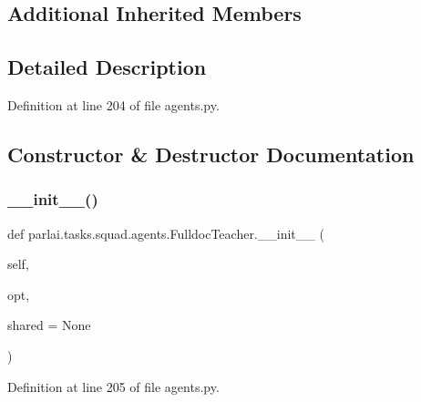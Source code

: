 \subsection*{Additional Inherited Members}


\subsection{Detailed Description}


Definition at line 204 of file agents.\+py.



\subsection{Constructor \& Destructor Documentation}
\mbox{\label{classparlai_1_1tasks_1_1squad_1_1agents_1_1FulldocTeacher_aa686d3cf1506d8f17e373c0b5db6e1bd}} 
\subsubsection{\texorpdfstring{\+\_\+\+\_\+init\+\_\+\+\_\+()}{\_\_init\_\_()}}
{\footnotesize\ttfamily def parlai.\+tasks.\+squad.\+agents.\+Fulldoc\+Teacher.\+\_\+\+\_\+init\+\_\+\+\_\+ (\begin{DoxyParamCaption}\item[{}]{self,  }\item[{}]{opt,  }\item[{}]{shared = {\ttfamily None} }\end{DoxyParamCaption})}



Definition at line 205 of file agents.\+py.


